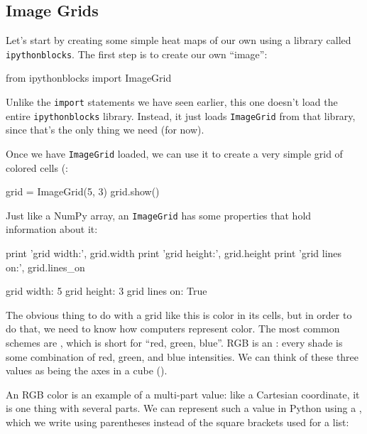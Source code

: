 \subsection{Image Grids}

Let's start by creating some simple heat maps of our own using a library
called \texttt{ipythonblocks}. The first step is to create our own
``image'':

\begin{VerbIn}
from ipythonblocks import ImageGrid
\end{VerbIn}

Unlike the \texttt{import} statements we have seen earlier, this one
doesn't load the entire \texttt{ipythonblocks} library. Instead, it just
loads \texttt{ImageGrid} from that library, since that's the only thing
we need (for now).

Once we have \texttt{ImageGrid} loaded, we can use it to create a very
simple grid of colored cells (:

\begin{VerbIn}
grid = ImageGrid(5, 3)
grid.show()
\end{VerbIn}


Just like a NumPy array, an \texttt{ImageGrid} has some properties that
hold information about it:

\begin{VerbIn}
print 'grid width:', grid.width
print 'grid height:', grid.height
print 'grid lines on:', grid.lines_on
\end{VerbIn}

\begin{VerbOut}
grid width: 5
grid height: 3
grid lines on: True
\end{VerbOut}

The obvious thing to do with a grid like this is color in its cells,
but in order to do that, we need to know how computers represent
color. The most common schemes are , which is short for
``red, green, blue''. RGB is an :
every shade is some combination of red, green, and blue
intensities. We can think of these three values as being the axes in a
cube ().


An RGB color is an example of a multi-part value: like a Cartesian
coordinate, it is one thing with several parts. We can represent such a
value in Python using a , which we write using
parentheses instead of the square brackets used for a list:

